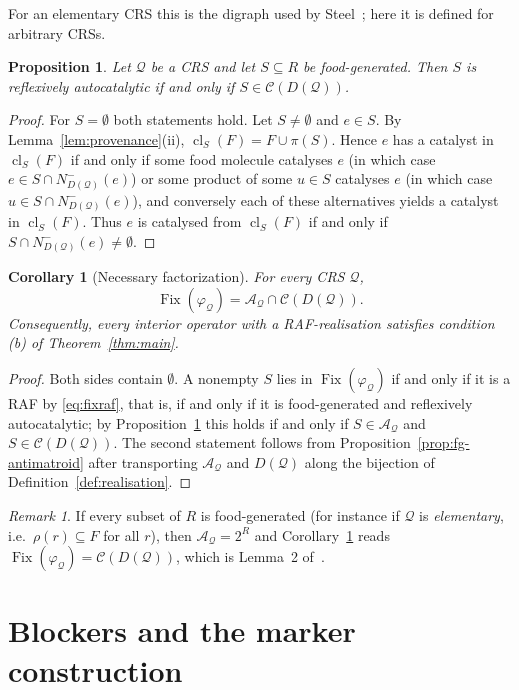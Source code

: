 \documentclass[11pt,a4paper]{article}
\theoremstyle{plain}
\newtheorem{proposition}[theorem]{Proposition}
\newtheorem{corollary}[theorem]{Corollary}
\theoremstyle{definition}
\theoremstyle{remark}
\newtheorem{remark}[theorem]{Remark}
\newcommand{\Fix}{\operatorname{Fix}}
\newcommand{\cl}{\operatorname{cl}}
\newcommand{\cA}{\mathcal{A}}
\newcommand{\cC}{\mathcal{C}}
\newcommand{\cQ}{\mathcal{Q}}
\newcommand{\pw}[1]{2^{#1}}
\newcommand{\Nin}{N^{-}}
\begin{document}
For an elementary CRS this is the digraph used by Steel~\cite[Section~3.2]{steel2023interior}; here it is defined for arbitrary CRSs.

\begin{proposition}\label{prop:static}
Let $\cQ$ be a CRS and let $S\subseteq R$ be food-generated. Then $S$ is reflexively autocatalytic if and only if $S\in\cC(D(\cQ))$.
\end{proposition}

\begin{proof}
For $S=\emptyset$ both statements hold. Let $S\neq\emptyset$ and $e\in S$. By Lemma~\ref{lem:provenance}(ii), $\cl_S(F)=F\cup\pi(S)$. Hence $e$ has a catalyst in $\cl_S(F)$ if and only if some food molecule catalyses $e$ (in which case $e\in S\cap\Nin_{D(\cQ)}(e)$) or some product of some $u\in S$ catalyses $e$ (in which case $u\in S\cap\Nin_{D(\cQ)}(e)$), and conversely each of these alternatives yields a catalyst in $\cl_S(F)$. Thus $e$ is catalysed from $\cl_S(F)$ if and only if $S\cap\Nin_{D(\cQ)}(e)\neq\emptyset$.
\end{proof}

\begin{corollary}[Necessary factorization]\label{cor:factor}
For every CRS $\cQ$,
\[
\Fix(\varphi_{\cQ})=\cA_{\cQ}\cap\cC(D(\cQ)).
\]
Consequently, every interior operator with a RAF-realisation satisfies condition \textup{(b)} of Theorem~\ref{thm:main}.
\end{corollary}

\begin{proof}
Both sides contain $\emptyset$. A nonempty $S$ lies in $\Fix(\varphi_{\cQ})$ if and only if it is a RAF by \eqref{eq:fixraf}, that is, if and only if it is food-generated and reflexively autocatalytic; by Proposition~\ref{prop:static} this holds if and only if $S\in\cA_{\cQ}$ and $S\in\cC(D(\cQ))$. The second statement follows from Proposition~\ref{prop:fg-antimatroid} after transporting $\cA_{\cQ}$ and $D(\cQ)$ along the bijection of Definition~\ref{def:realisation}.
\end{proof}

\begin{remark}
If every subset of $R$ is food-generated (for instance if $\cQ$ is \emph{elementary}, i.e.\ $\rho(r)\subseteq F$ for all $r$), then $\cA_{\cQ}=\pw{R}$ and Corollary~\ref{cor:factor} reads $\Fix(\varphi_{\cQ})=\cC(D(\cQ))$, which is Lemma~2 of~\cite{steel2023interior}.
\end{remark}

\section{Blockers and the marker construction}\label{sec:blockers}
\end{document}
